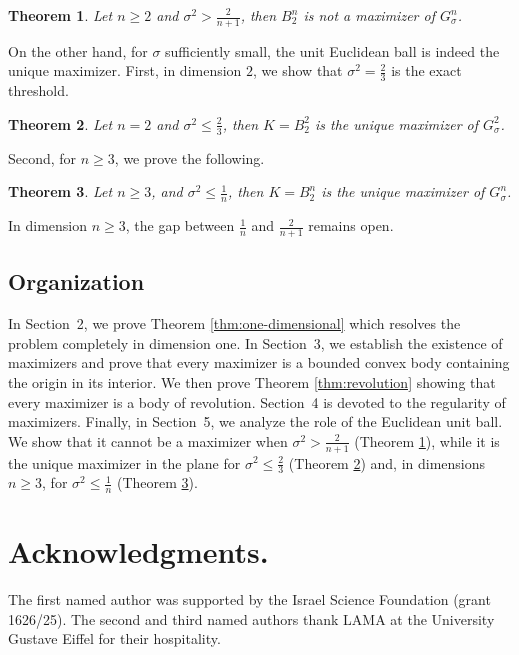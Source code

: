\documentclass[12pt,oneside,reqno]{amsart}
\numberwithin{equation}{section}
\newtheorem{theorem}{Theorem}[section]
\theoremstyle{remark}
\begin{document}
\begin{theorem}\label{thm:not-ball}
Let $n\ge2$ and $\sigma^2>{\frac{2}{n+1}}$, then $B_2^n$ is not a maximizer of $G^n_\sigma$.
\end{theorem}

On the other hand, for $\sigma$ sufficiently small, the unit Euclidean ball is indeed the unique maximizer. First, in dimension $2$, we show that $\sigma^2=\frac 2{3}$ is the exact threshold. 

\begin{theorem}\label{thm:small-sigma2}
Let $n=2$ and  $\sigma^2\le{ \frac23}$,
then $K=B_2^2$ is the unique maximizer of $G^2_\sigma$.  
\end{theorem}

Second, for $n\ge 3$, we prove the following.

\begin{theorem}\label{thm:small-sigma}
Let $n\ge 3$, and $\sigma^2\le\frac1{ n}$,
then $K=B_2^n$ is the unique maximizer of $G^n_\sigma$.  
\end{theorem}

 In dimension $n\ge 3$, the gap between \( {\frac{1}{n}}\) and \( {\frac{2}{n+1}}\) remains open.



\subsection*{Organization} 
In Section~2, we prove Theorem \ref{thm:one-dimensional} which resolves the problem completely in dimension one.  In Section~3, we establish the existence of maximizers and prove that every maximizer is a bounded convex body containing the origin in its interior. We then prove Theorem \ref{thm:revolution} showing that every maximizer is a body of revolution. Section~4 is devoted to the regularity of maximizers. Finally, in Section~5, we analyze the role of the Euclidean unit ball. We show that it cannot be a maximizer when $\sigma^2>\frac{2}{n+1}$ (Theorem \ref{thm:not-ball}), while it is the unique maximizer in the plane for $\sigma^2\leq \frac{2}{3}$ (Theorem \ref{thm:small-sigma2}) and, in dimensions $n\geq3$, for $\sigma^2\leq \frac{1}{n}$ (Theorem \ref{thm:small-sigma}).

\section*{Acknowledgments.}
The first named author was supported by the Israel Science Foundation (grant 1626/25). The second and third named authors thank LAMA at the University Gustave Eiffel for their hospitality. 
\end{document}
